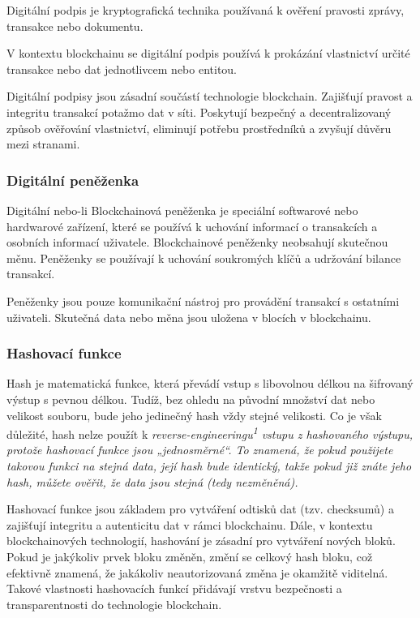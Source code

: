 Digitální podpis je kryptografická technika používaná k ověření pravosti zprávy, transakce nebo dokumentu. 

V kontextu blockchainu se digitální podpis používá k prokázání vlastnictví určité transakce nebo dat jednotlivcem nebo entitou.

Digitální podpisy jsou zásadní součástí technologie blockchain. Zajišťují pravost a integritu transakcí potažmo dat v síti. Poskytují bezpečný a decentralizovaný způsob ověřování vlastnictví, eliminují potřebu prostředníků a zvyšují důvěru mezi stranami.	\cite{Digitální podpis}


\subsubsection{Digitální peněženka}\label{subsubsec:DigWallet}

Digitální nebo-li Blockchainová peněženka je speciální softwarové nebo hardwarové zařízení, které se používá k uchování informací o transakcích a osobních informací uživatele. Blockchainové peněženky neobsahují skutečnou měnu. Peněženky se používají k uchování soukromých klíčů a udržování bilance transakcí.

Peněženky jsou pouze komunikační nástroj pro provádění transakcí s ostatními uživateli. Skutečná data nebo měna jsou uložena v blocích v blockchainu.	\cite{Kryptografie v Blockchain}







\subsubsection{Hashovací funkce}\label{subsubsec:Hash}

Hash je matematická funkce, která převádí vstup s libovolnou délkou na šifrovaný výstup s pevnou délkou. Tudíž, bez ohledu na původní množství dat nebo velikost souboru, bude jeho jedinečný hash vždy stejné velikosti. Co je však důležité, hash nelze použít k \it{reverse-engineeringu}\textsuperscript{1} vstupu z hashovaného výstupu, protože hashovací funkce jsou „jednosměrné“. To znamená, že pokud použijete takovou funkci na stejná data, její hash bude identický, takže pokud již znáte jeho hash, můžete ověřit, že data jsou stejná (tedy nezměněná).

Hashovací funkce jsou základem pro vytváření odtisků dat (tzv. checksumů) a zajišťují integritu a autenticitu dat v rámci blockchainu. Dále, v kontextu blockchainových technologií, hashování je zásadní pro vytváření nových bloků. Pokud je jakýkoliv prvek bloku změněn, změní se celkový hash bloku, což efektivně znamená, že jakákoliv neautorizovaná změna je okamžitě viditelná. Takové vlastnosti hashovacích funkcí přidávají vrstvu bezpečnosti a transparentnosti do technologie blockchain.	\cite{Hash-funkce}






